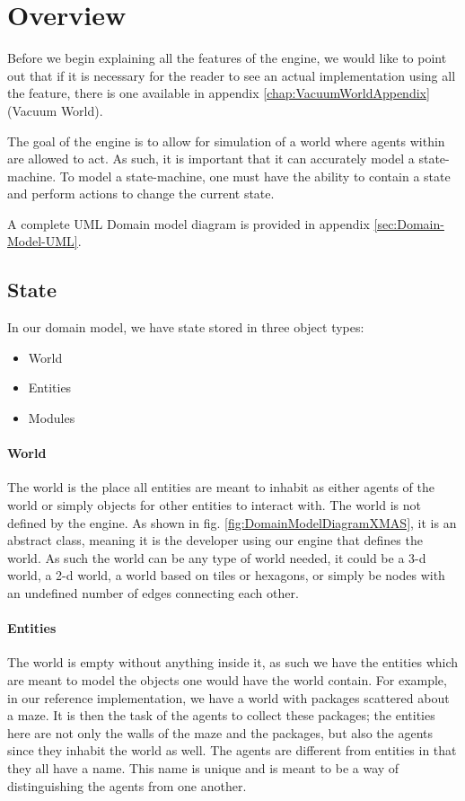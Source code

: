 
\section{Overview}

Before we begin explaining all the features of the engine, we would
like to point out that if it is necessary for the reader to see an
actual implementation using all the feature, there is one available
in appendix \ref{chap:VacuumWorldAppendix} (Vacuum World).

The goal of the engine is to allow for simulation of a world where
agents within are allowed to act. As such, it is important that it
can accurately model a state-machine. To model a state-machine, one
must have the ability to contain a state and perform actions to change
the current state. 

A complete UML Domain model diagram is provided in appendix \ref{sec:Domain-Model-UML}.


\subsection{State}

In our domain model, we have state stored in three object types:
\begin{itemize}
\item World
\item Entities
\item Modules
\end{itemize}

\paragraph*{World}

The world is the place all entities are meant to inhabit as either
agents of the world or simply objects for other entities to interact
with. The world is not defined by the engine. As shown in fig. \ref{fig:DomainModelDiagramXMAS},
it is an abstract class, meaning it is the developer using our engine
that defines the world. As such the world can be any type of world
needed, it could be a 3-d world, a 2-d world, a world based on tiles
or hexagons, or simply be nodes with an undefined number of edges
connecting each other.


\paragraph*{Entities}

The world is empty without anything inside it, as such we have the
entities which are meant to model the objects one would have the world
contain. For example, in our reference implementation, we have a world
with packages scattered about a maze. It is then the task of the agents
to collect these packages; the entities here are not only the walls
of the maze and the packages, but also the agents since they inhabit
the world as well. The agents are different from entities in that
they all have a name. This name is unique and is meant to be a way
of distinguishing the agents from one another. 


